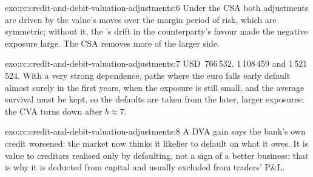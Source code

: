 \begin{solution}{exo:rc:credit-and-debit-valuation-adjustments:6}
Under the CSA both adjustments are driven by the value's moves over the margin period of
risk, which are symmetric; without it, the 's drift in the counterparty's favour
made the negative exposure large. The CSA removes more of the larger side.
\end{solution}

\begin{solution}{exo:rc:credit-and-debit-valuation-adjustments:7}
USD~766\,532, 1\,108\,459 and 1\,521\,524. With a very strong dependence, paths where the euro falls
early default almost surely in the first years, when the exposure is still small, and the
average survival must be kept, so the defaults are taken from the later, larger exposures: the
CVA turns down after $b\approx7$.
\end{solution}

\begin{solution}{exo:rc:credit-and-debit-valuation-adjustments:8}
A DVA gain says the bank's own credit worsened: the market now thinks it likelier to default
on what it owes. It is value to creditors realised only by defaulting, not a sign of a better
business; that is why it is deducted from capital and usually excluded from traders' P\&L.
\end{solution}

